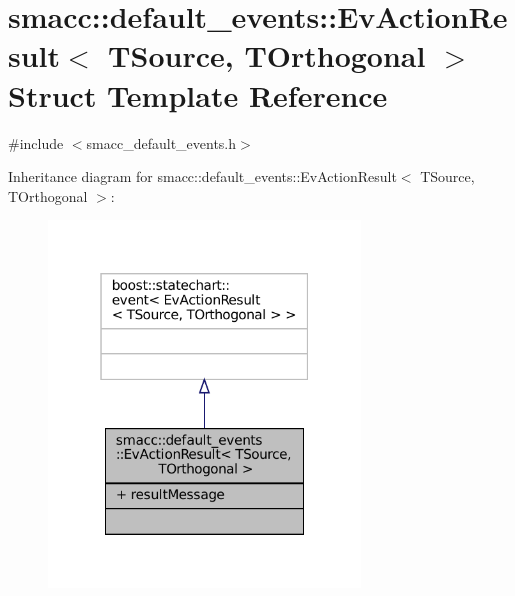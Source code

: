 \hypertarget{structsmacc_1_1default__events_1_1EvActionResult}{}\section{smacc\+:\+:default\+\_\+events\+:\+:Ev\+Action\+Result$<$ T\+Source, T\+Orthogonal $>$ Struct Template Reference}
\label{structsmacc_1_1default__events_1_1EvActionResult}


{\ttfamily \#include $<$smacc\+\_\+default\+\_\+events.\+h$>$}



Inheritance diagram for smacc\+:\+:default\+\_\+events\+:\+:Ev\+Action\+Result$<$ T\+Source, T\+Orthogonal $>$\+:
\nopagebreak
\begin{figure}[H]
\begin{center}
\leavevmode
\includegraphics[width=235pt]{structsmacc_1_1default__events_1_1EvActionResult__inherit__graph}
\end{center}
\end{figure}


